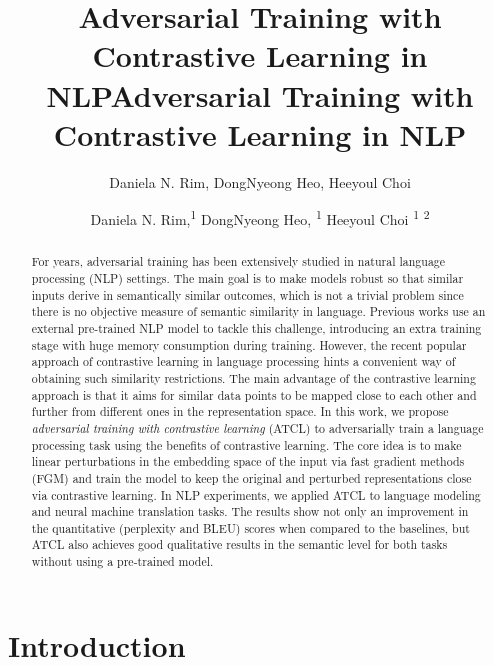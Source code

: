 \documentclass[letterpaper]{article} %
\title{Adversarial Training with Contrastive Learning in NLP}
\author{
    Daniela N. Rim,
    DongNyeong Heo,
    Heeyoul Choi
}
\title{Adversarial Training with Contrastive Learning in NLP}
\author {
    Daniela N. Rim,\textsuperscript{\rm 1}
    DongNyeong Heo, \textsuperscript{\rm 1}
    Heeyoul Choi \textsuperscript{\rm 1} \textsuperscript{\rm 2}
}
\begin{document}
\maketitle

\begin{abstract}
For years, adversarial training has been extensively studied in natural language processing (NLP) settings. The main goal is to make models robust so that similar inputs derive in semantically similar outcomes, which is not a trivial problem since there is no objective measure of semantic similarity in language. 
Previous works use an external pre-trained NLP model to tackle this challenge, introducing an extra training stage with huge memory consumption during training. 
However, the recent popular approach of contrastive learning in language processing hints a convenient way of obtaining such similarity restrictions. The main advantage of the contrastive learning approach is that it aims for similar data points to be mapped close to each other and further from different ones in the representation space. 
In this work, we propose \textit{adversarial training with contrastive learning} (ATCL) to adversarially train a language processing task using the benefits of contrastive learning. The core idea is to make linear perturbations in the embedding space of the input via fast gradient methods (FGM) and train the model to keep the original and perturbed representations close via contrastive learning. In NLP experiments, we applied ATCL to language modeling and neural machine translation tasks. The results show not only an improvement in the quantitative (perplexity and BLEU) scores when compared to the baselines, but ATCL also achieves good qualitative results in the semantic level for both tasks without using a pre-trained model.
\end{abstract}


\section{Introduction}
\end{document}
